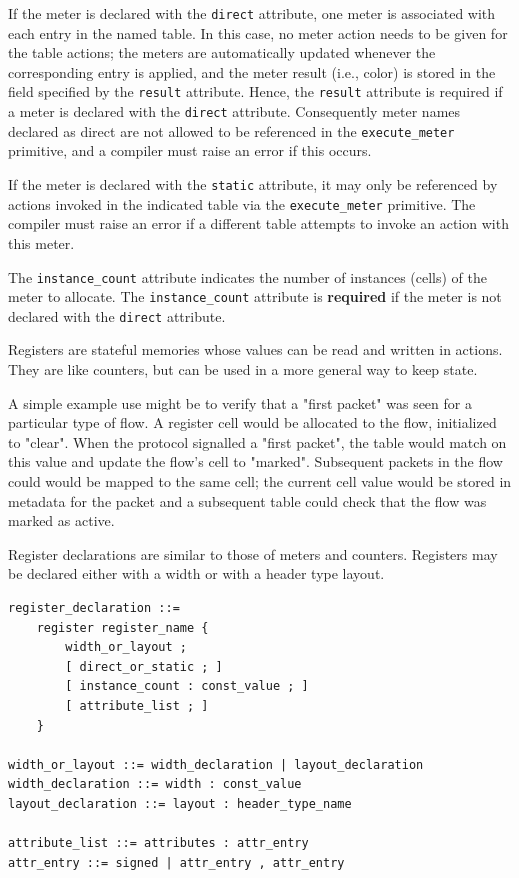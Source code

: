 \documentclass[12pt]{article}
\begin{document}
If the meter is declared with the \texttt{direct} attribute, one meter
is associated with each entry in the named table. In this case, no 
meter action needs to be given for the table actions; the meters are 
automatically updated whenever the corresponding entry is applied,
and the meter result (i.e., color) is stored in the field specified 
by the \texttt{result} attribute. Hence, the \texttt{result} attribute
is required if a meter is declared with the \texttt{direct} attribute.
Consequently meter names declared as direct are not allowed to be 
referenced in the \texttt{execute_meter} primitive, and a compiler must
raise an error if this occurs. 

If the meter is declared with the \texttt{static} attribute, it may only
be referenced by actions invoked in the indicated table via the \texttt{execute_meter}
primitive. The compiler must raise an error if a different table 
attempts to invoke an action with this meter.

The \texttt{instance_count} attribute indicates the number of
instances (cells) of the meter to allocate.  The
\texttt{instance_count} attribute is \textbf{required} if the meter
is not declared with the \texttt{direct} attribute.


Registers are stateful memories whose values can be read and written
in actions.  They are like counters, but can be used in a more general
way to keep state.

A simple example use might be to verify that a "first packet" was seen
for a particular type of flow. A register cell would be allocated to
the flow, initialized to "clear". When the protocol signalled a "first
packet", the table would match on this value and update the flow's
cell to "marked".  Subsequent packets in the flow could would be
mapped to the same cell; the current cell value would be stored in
metadata for the packet and a subsequent table could check that the
flow was marked as active.

Register declarations are similar to those of meters and
counters. Registers may be declared either with a width or with a
header type layout.

\begin{lstlisting}[style=BNFstyle]
register_declaration ::= 
    register register_name {
        width_or_layout ;
        [ direct_or_static ; ]
        [ instance_count : const_value ; ]
        [ attribute_list ; ]
    }

width_or_layout ::= width_declaration | layout_declaration
width_declaration ::= width : const_value
layout_declaration ::= layout : header_type_name

attribute_list ::= attributes : attr_entry
attr_entry ::= signed | attr_entry , attr_entry
\end{lstlisting}
\end{document}
